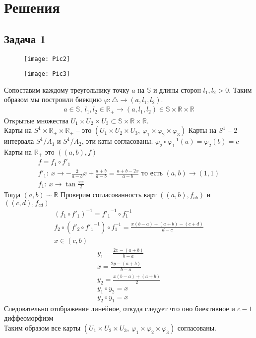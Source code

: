 
\newpage
\section*{Решения}
\subsection*{Задача 1}
	\begin{figure}[!h]
		\begin{minipage}[h]{0.49\linewidth}
			\center\texttt{[image: Pic2]}
		\end{minipage}
		\begin{minipage}[h]{0.49\linewidth}
			\center\texttt{[image: Pic3]}
		\end{minipage}
	\end{figure}
	\vskip 0.1in
	Сопоставим каждому треугольнику точку $a$ на $\mathbb{S}$ и длины сторон $l_1, l_2 > 0$. Таким образом мы построили биекцию $\varphi: \triangle \to (a, l_1, l_2)$.
	\begin{gather*}
		a \in \mathbb{S},\ l_1, l_2 \in \mathbb{R}_{+} \rightarrow (a,l_1,l_2) \in \mathbb{S} \times \mathbb{R} \times \mathbb{R}
	\end{gather*}
	Открытые множества $U_1 \times U_2 \times U_3 \subset \mathbb{S} \times \mathbb{R} \times \mathbb{R}$.\\
	Карты на $S^{1} \times \mathbb{R}_{+} \times \mathbb{R}_{+}$ -- это $(U_1 \times U_2 \times U_3,\ \varphi_1 \times \varphi_2 \times \varphi_3)$
	\vskip 0.2in
	Карты на $S^{1}$ -- 2 интервала $S^{1} \slash A_1$ и $S^{1} \slash A_2$, эти каты согласованы. $\varphi_2 \circ \varphi_1^{-1}(a) = \varphi_2(b) = c$
	\vskip 0.1in
	Карты на $\mathbb{R}_{+}$ это $((a,b),f)$
	\begin{gather*}
		f = f_1 \circ f'_1\\
		f'_1:\ x \to -\frac{2}{a-b} x + \frac{a+b}{a-b} = \frac{a+b-2x}{a-b} \text{ то есть } (a,b) \to (1,1)\\
		f_1:\ x \to \tan \frac{\pi x}{2}
	\end{gather*}
	Тогда $(a,b) \sim \mathbb{R}$
	\vskip 0.1in
	Проверим согласованность карт $((a,b), f_{ab})$ и $((c,d), f_{cd})$
	\begin{gather*}
		(f_1 \circ f'_1)^{-1} = {f'_1}^{-1} \circ f_1^{-1}\\
		f_2 \circ (f'_2 \circ {f'_1}^{-1}) \circ f_1^{-1} = \frac{x(b-a) + (a+b) - (c+d)}{d-c}\\
		x \in (c,b)
	\end{gather*}
	\begin{gather*}
		y_1 = \frac{2x-(a+b)}{b-a}\\
		x = \frac{2y-(a+b)}{b-a}\\
		y_2 = \frac{x(b-a)+(a+b)}{2}\\
		y_1 \circ y_2 = x\\
		y_2 \circ y_1 = x
	\end{gather*}
	Следовательно отображение линейное, откуда следует что оно биективное и $c-1$ диффеоморфизм\\
	Таким образом все карты $(U_1 \times U_2 \times U_3,\ \varphi_1 \times \varphi_2 \times \varphi_3)$ согласованы.
\newpage
